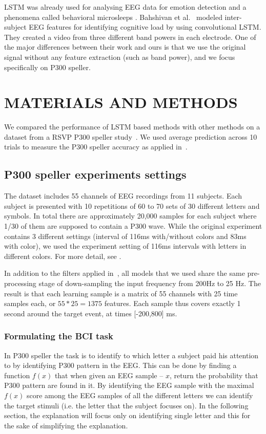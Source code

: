 \documentclass[
12pt, %
english, %
doublespacing, %
headsepline, %
]{MastersDoctoralThesis} %
\begin{document}
LSTM was already used for analysing EEG data for emotion detection \cite{soleymani2014continuous} and a phenomena called behavioral microsleeps \cite{davidson2005detecting}. Bahshivan et al.~\cite{LSTM_EEG} modeled inter-subject EEG features for identifying cognitive load by using convolutional LSTM. They created a video from three different band powers in each electrode. One of the major differences between their work and ours is that we use the original signal without any feature extraction (such as band power), and we focus specifically on P300 speller.



\chapter{MATERIALS AND METHODS}

We compared the performance of LSTM based methods with other methods on a dataset from a RSVP P300 speller study~\cite{BlaknertzExperiment}. We used  average prediction across 10 trials to measure the P300 speller accuracy as applied in~\cite{BlaknertzExperiment}.




\section{P300 speller experiments settings}
The dataset includes 55 channels of EEG recordings from 11 subjects. Each subject is presented with 10 repetitions of 60 to 70 sets of 30 different letters and symbols. In total there are approximately 20,000 samples for each subject where 1/30 of them are supposed to contain a P300 wave. While the original experiment contains 3 different settings (interval of 116ms with/without colors and 83ms with color), we used the experiment setting of 116ms intervals with letters in different colors. For more detail, see \cite{BlaknertzExperiment}. 

In addition to the filters applied in~\cite{BlaknertzExperiment}, all models that we used share the same pre-processing stage of down-sampling the input frequency from 200Hz to 25 Hz. The result is that each learning sample is a matrix of 55 channels with 25 time samples each, or $55*25 = 1375$ features. Each sample thus covers exactly 1 second around the target event, at times [-200,800] ms.

\subsection{Formulating the BCI task}
In P300 speller the task is to identify to which letter a subject paid his attention to by identifying P300 pattern in the EEG. This can be done by finding a function $f(x)$ that when given an EEG sample – $x$, return the probability that P300 pattern are found in it. By identifying the EEG sample with the maximal $f(x)$ score among the EEG samples of all the different letters we can identify the target stimuli (i.e. the letter that the subject focuses on). In the following section, the explanation will focus only on identifying single letter and this for the sake of simplifying the explanation.
\end{document}
